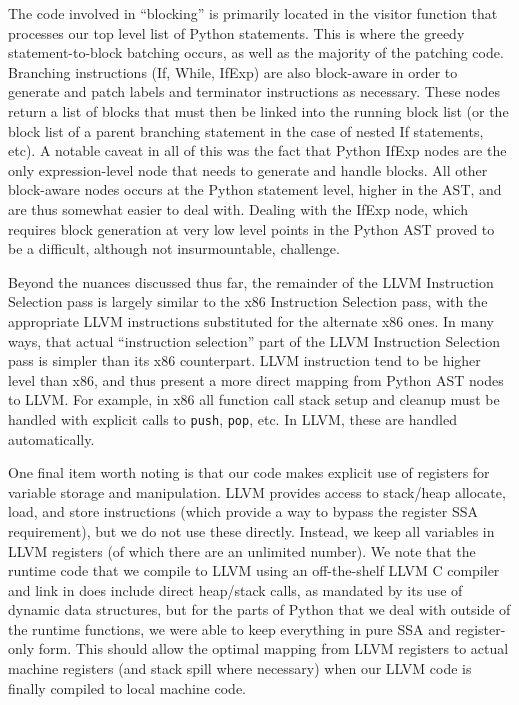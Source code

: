 \documentclass[11pt,twocolumn]{article}
\begin{document}
The code involved in ``blocking'' is primarily located in the visitor
function that processes our top level list of Python statements. This
is where the greedy statement-to-block batching occurs, as well as the
majority of the patching code. Branching instructions (If, While,
IfExp) are also block-aware in order to generate and patch labels and
terminator instructions as necessary. These nodes return a list of
blocks that must then be linked into the running block list (or the
block list of a parent branching statement in the case of nested If
statements, etc). A notable caveat in all of this was the fact that
Python IfExp nodes are the only expression-level node that needs to
generate and handle blocks. All other block-aware nodes occurs at the
Python statement level, higher in the AST, and are thus somewhat
easier to deal with. Dealing with the IfExp node, which requires block
generation at very low level points in the Python AST proved to be a
difficult, although not insurmountable, challenge.


Beyond the nuances discussed thus far, the remainder of the LLVM
Instruction Selection pass is largely similar to the x86 Instruction
Selection pass, with the appropriate LLVM instructions substituted for
the alternate x86 ones. In many ways, that actual ``instruction
selection'' part of the LLVM Instruction Selection pass is simpler
than its x86 counterpart. LLVM instruction tend to be higher level
than x86, and thus present a more direct mapping from Python AST nodes
to LLVM. For example, in x86 all function call stack setup and cleanup
must be handled with explicit calls to \texttt{push}, \texttt{pop},
etc. In LLVM, these are handled automatically.

One final item worth noting is that our code makes explicit use of
registers for variable storage and manipulation. LLVM provides access
to stack/heap allocate, load, and store instructions (which provide a
way to bypass the register SSA requirement), but we do not use these
directly. Instead, we keep all variables in LLVM registers (of which
there are an unlimited number). We note that the runtime code that we
compile to LLVM using an off-the-shelf LLVM C compiler and link in does
include direct heap/stack calls, as mandated by its use of dynamic
data structures, but for the parts of Python that we deal with outside
of the runtime functions, we were able to keep everything in pure SSA
and register-only form. This should allow the optimal mapping from
LLVM registers to actual machine registers (and stack spill where
necessary) when our LLVM code is finally compiled to local machine
code.
\end{document}
